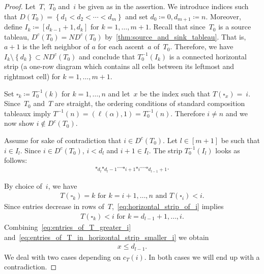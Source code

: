 \documentclass[ALCO,ThmDefs,Unicode,epreuves]{cedram}
\newcommand{\DC}{\operatorname{\mathit{D^c}}}
\newcommand{\ND}{\operatorname{\mathit{ND^c}}}
\newcommand{\set}[1]{\left\{ #1 \right\}}
\newcommand{\cell}{\square}
\begin{document}
\begin{proof}
	Let~$T$,~$T_0$ and~$i$ be given as in the assertion. 
	We introduce indices such that
	$D(T_0)= \set{ d_1 < d_2 < \cdots < d_m}$ and set $d_0 \coloneqq 0, d_{m+1} \coloneqq n$. Moreover,
	 define $I_k\coloneqq [d_{k-1}+1 , d_k]$ for $k= 1, \ldots, m+1$. 
	 Recall that since~$T_0$ is a source tableau, $\DC(T_0)= \ND(T_0)$ by~\cref{thm:source_and_sink_tableau}. 
	 That is, $a+1$ is the left neighbor of $a$ for each ascent~$a$ of~$T_0$. Therefore, we have $I_k\setminus \set{d_k} \subset \ND(T_0)$ and conclude that $T^{-1}_0(I_k)$ is a connected horizontal strip (a one-row diagram which contains all cells between its leftmost and rightmost cell) for $k = 1,\dots,m+1$.
	 
	Set $\cell_k \coloneqq T_0^{-1}(k)$ for $k=1,\dots, n$ and let~$x$ be the index such that $T(\cell_x)=~i$. 
	Since~$T_0$ and~$T$ are straight, the ordering conditions of standard composition tableaux imply $T^{-1}(n)= (\ell(\alpha), 1) = T_0^{-1}(n)$. Therefore $i\neq n$ and we now show $i\notin \DC(T_0)$.	
	
	Assume for sake of contradiction that $i\in \DC(T_0)$.
	Let $l\in [m+1]$ be such that $i\in I_l$. 
	Since $i \in \DC(T_0)$, $i<d_l$ and $i+1\in I_l$. 
	The strip $T^{-1}_0(I_l)$ looks as follows:
	\begin{align}
	\label{eq:horizontal_strip_of_i}
	\cell_{d_{l}} \cell_{d_{l} -1} \cdots \cell_{i+1} \cell_i \cdots \cell_{d_{l-1} + 1}.
	\end{align}	

	By choice of~$i$, we have 
	\begin{align}
	\label{eq:entries_of_T_greater_i}
	\text{$T(\cell_k) = k$ for $k=i+1,\dots, n$ and 	$T(\cell_i) < i$.}
	\end{align}
	Since entries decrease in rows of~$T$,~\eqref{eq:horizontal_strip_of_i} implies 
	\begin{align}
	\label{eq:entries_of_T_in_horizontal_strip_smaller_i}
	T(\cell_k) < i \text{ for } k=d_{l-1}+1,\dots , i. 
	\end{align}
	Combining~\eqref{eq:entries_of_T_greater_i} and~\eqref{eq:entries_of_T_in_horizontal_strip_smaller_i} we obtain
	\begin{align}
	\label{eq:bound_for_x}
	 x\leq d_{l-1}.
	\end{align}
	We deal with two cases depending on $c_T(i)$. 
	In both cases we will end up with a contradiction.
	

\end{proof}
\end{document}
